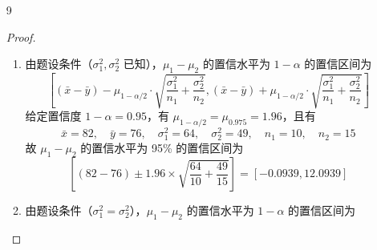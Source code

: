 \documentclass[normal,cn]{elegantnote}
\begin{document}
\begin{enumerate}
\begin{proof}
\begin{enumerate}
\begin{equation*}
                      \end{equation*}
                      且有 $s=35.2176$。故 $\sigma^{2}$ 的置信水平为 95\% 的置信区间为
                      \begin{equation*}
                          \left[\frac{9\times 35.2176^{2}}{19.0228},\frac{9\times 35.2176^{2}}{2.7004}\right]=[586.7958,4133.6469]
                      \end{equation*}
                      因此，$\sigma$ 的置信水平为 95\% 的置信区间为
                      \begin{equation*}
                          [\sqrt{586.7958},\sqrt{4133.6469}]=[24.2239,64.2934]
                      \end{equation*}
            \end{enumerate}
        \end{proof}
    \item[9]
        \begin{proof}
            \begin{enumerate}
                \item 由题设条件（$\sigma_{1}^{2},\sigma_{2}^{2}$ 已知），$\mu_{1}-\mu_{2}$ 的置信水平为 $1-\alpha$ 的置信区间为
                      \begin{equation*}
                          \left[\left(\bar{x}-\bar{y}\right)-\mu_{1-\alpha/2}\cdot\sqrt{\frac{\sigma_{1}^{2}}{n_{1}}+\frac{\sigma_{2}^{2}}{n_{2}}},\left(\bar{x}-\bar{y}\right)+\mu_{1-\alpha/2}\cdot\sqrt{\frac{\sigma_{1}^{2}}{n_{1}}+\frac{\sigma_{2}^{2}}{n_{2}}}\right]
                      \end{equation*}
                      给定置信度 $1-\alpha=0.95$，有 $\mu_{1-\alpha/2}=\mu_{0.975}=1.96$，且有
                      \begin{equation*}
                          \bar{x}=82,\quad\bar{y}=76,\quad\sigma_{1}^{2}=64,\quad\sigma_{2}^{2}=49,\quad n_{1}=10,\quad n_{2}=15
                      \end{equation*}
                      故 $\mu_{1}-\mu_{2}$ 的置信水平为 95\% 的置信区间为
                      \begin{equation*}
                          \left[\left(82-76\right) \pm 1.96\times\sqrt{\frac{64}{10}+\frac{49}{15}}\right]=[-0.0939,12.0939]
                      \end{equation*}
                \item 由题设条件（$\sigma_{1}^{2}=\sigma_{2}^{2}$），$\mu_{1}-\mu_{2}$ 的置信水平为 $1-\alpha$ 的置信区间为
                      \begin{equation*}

\end{equation*}
\end{enumerate}
\end{proof}
\end{enumerate}
\end{document}
